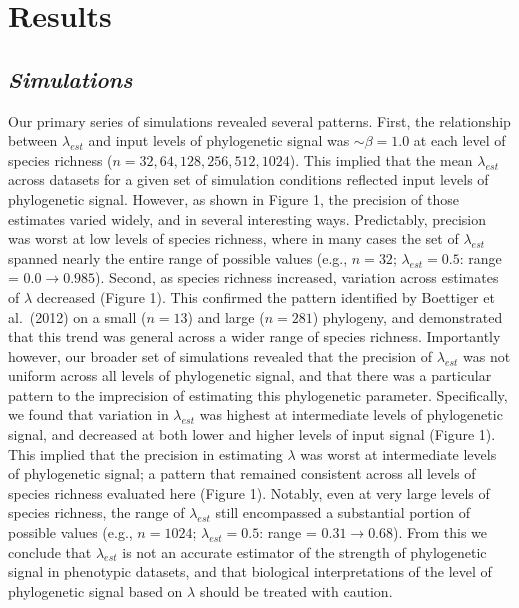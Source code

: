 \documentclass[
]{article}
\begin{document}
\hypertarget{results}{%
\section{Results}\label{results}}

\hypertarget{simulations-1}{%
\subsection{\texorpdfstring{\emph{Simulations}}{Simulations}}\label{simulations-1}}

Our primary series of simulations revealed several patterns. First, the
relationship between \(\lambda_{est}\) and input levels of phylogenetic
signal was \(\sim\beta=1.0\) at each level of species richness
(\(n=32, 64, 128, 256, 512, 1024\)). This implied that the mean
\(\lambda_{est}\) across datasets for a given set of simulation
conditions reflected input levels of phylogenetic signal. However, as
shown in Figure 1, the precision of those estimates varied widely, and
in several interesting ways. Predictably, precision was worst at low
levels of species richness, where in many cases the set of
\(\lambda_{est}\) spanned nearly the entire range of possible values
(e.g., \(n=32\); \(\lambda_{est}=0.5\): range = \(0.0\to0.985\)).
Second, as species richness increased, variation across estimates of
\(\lambda\) decreased (Figure 1). This confirmed the pattern identified
by Boettiger et al.~(2012) on a small (\(n=13\)) and large (\(n=281\))
phylogeny, and demonstrated that this trend was general across a wider
range of species richness. Importantly however, our broader set of
simulations revealed that the precision of \(\lambda_{est}\) was not
uniform across all levels of phylogenetic signal, and that there was a
particular pattern to the imprecision of estimating this phylogenetic
parameter. Specifically, we found that variation in \(\lambda_{est}\)
was highest at intermediate levels of phylogenetic signal, and decreased
at both lower and higher levels of input signal (Figure 1). This implied
that the precision in estimating \(\lambda\) was worst at intermediate
levels of phylogenetic signal; a pattern that remained consistent across
all levels of species richness evaluated here (Figure 1). Notably, even
at very large levels of species richness, the range of \(\lambda_{est}\)
still encompassed a substantial portion of possible values (e.g.,
\(n=1024\); \(\lambda_{est}=0.5\): range = \(0.31\to 0.68\)). From this
we conclude that \(\lambda_{est}\) is not an accurate estimator of the
strength of phylogenetic signal in phenotypic datasets, and that
biological interpretations of the level of phylogenetic signal based on
\(\lambda\) should be treated with caution. \hfill\break
\end{document}
